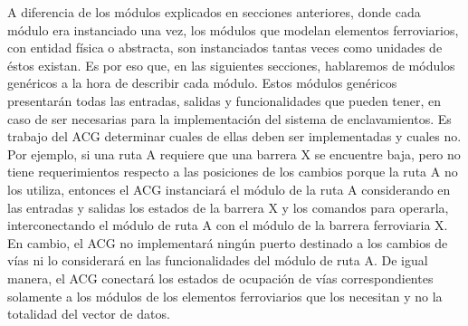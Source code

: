 	A diferencia de los módulos explicados en secciones anteriores, donde cada módulo era instanciado una vez, los módulos que modelan elementos ferroviarios, con entidad física o abstracta, son instanciados tantas veces como unidades de éstos existan. Es por eso que, en las siguientes secciones, hablaremos de módulos genéricos a la hora de describir cada módulo. Estos módulos genéricos presentarán todas las entradas, salidas y funcionalidades que pueden tener, en caso de ser necesarias para la implementación del sistema de enclavamientos. Es trabajo del ACG determinar cuales de ellas deben ser implementadas y cuales no. Por ejemplo, si una ruta A requiere que una barrera X se encuentre baja, pero no tiene requerimientos respecto a las posiciones de los cambios porque la ruta A no los utiliza, entonces el ACG instanciará el módulo de la ruta A considerando en las entradas y salidas los estados de la barrera X y los comandos para operarla, interconectando el módulo de ruta A con el módulo de la barrera ferroviaria X. En cambio, el ACG no implementará ningún puerto destinado a los cambios de vías ni lo considerará en las funcionalidades del módulo de ruta A. De igual manera, el ACG conectará los estados de ocupación de vías correspondientes solamente a los módulos de los elementos ferroviarios que los necesitan y no la totalidad del vector de datos.
	
	
	
	
	
	
	
	